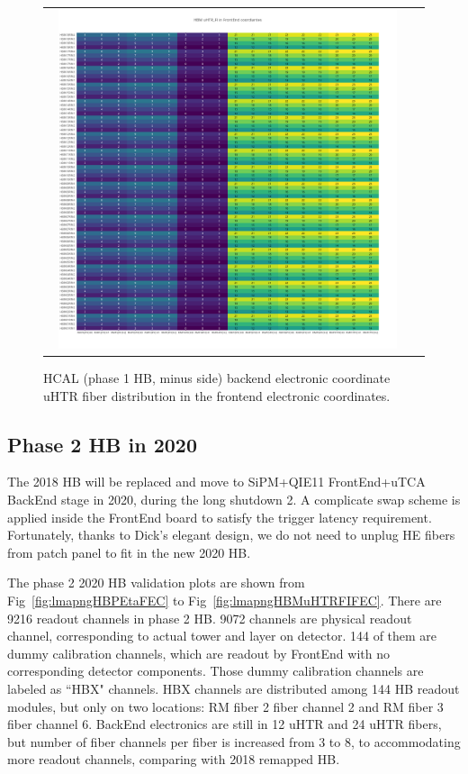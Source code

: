 \begin{figure}[htb]
 \begin{center}
  \begin{tabular}{cc}
   \includegraphics[angle=0,width=0.95\textwidth]{figures/appendix/HBM_uHTR_FI_in_FrontEnd.png}
  \end{tabular}
  \caption{HCAL (phase 1 HB, minus side) backend electronic coordinate uHTR fiber distribution in the frontend electronic coordinates.}
  \label{fig:lmapHBMuHTRFIFEC}
 \end{center}
\end{figure}
\clearpage

\subsection{Phase 2 HB in 2020}
The 2018 HB will be replaced and move to SiPM+QIE11 FrontEnd+uTCA BackEnd stage in 2020, during the long shutdown 2. A complicate swap scheme is applied inside the FrontEnd board to satisfy the trigger latency requirement. Fortunately, thanks to Dick’s elegant design, we do not need to unplug HE fibers from patch panel to fit in the new 2020 HB.

The phase 2 2020 HB validation plots are shown from Fig~\ref{fig:lmapngHBPEtaFEC} to Fig~\ref{fig:lmapngHBMuHTRFIFEC}. There are 9216 readout channels in phase 2 HB. 9072 channels are physical readout channel, corresponding to actual tower and layer on detector. 144 of them are dummy calibration channels, which are readout by FrontEnd with no corresponding detector components. Those dummy calibration channels are labeled as ``HBX" channels. HBX channels are distributed among 144 HB readout modules, but only on two locations: RM fiber 2 fiber channel 2 and RM fiber 3 fiber channel 6. BackEnd electronics are still in 12 uHTR and 24 uHTR fibers, but number of fiber channels per fiber is increased from 3 to 8, to accommodating more readout channels, comparing with 2018 remapped HB.
\clearpage

